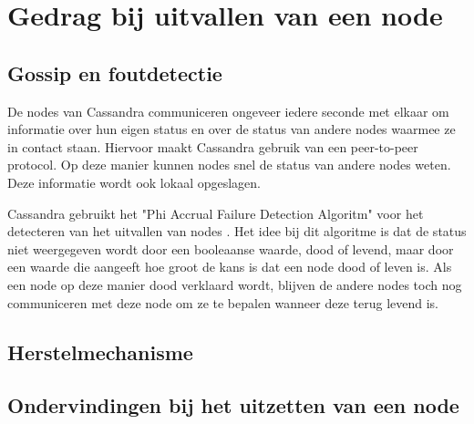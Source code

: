 \chapter{Gedrag bij uitvallen van een node}
\label{ch:cassandra_uitval}

\section{Gossip en foutdetectie}
De nodes van Cassandra communiceren ongeveer iedere seconde met elkaar om informatie over hun eigen status en over de status van andere nodes waarmee ze in contact staan.
Hiervoor maakt Cassandra gebruik van een peer-to-peer protocol.
Op deze manier kunnen nodes snel de status van andere nodes weten.
Deze informatie wordt ook lokaal opgeslagen.

Cassandra gebruikt het "Phi Accrual Failure Detection Algoritm" voor het detecteren van het uitvallen van nodes \citep{kan2014cassandra}.
Het idee bij dit algoritme is dat de status niet weergegeven wordt door een booleaanse waarde, dood of levend, maar door een waarde die aangeeft hoe groot de kans is dat een node dood of leven is.
Als een node op deze manier dood verklaard wordt, blijven de andere nodes toch nog communiceren met deze node om ze te bepalen wanneer deze terug levend is.

\section{Herstelmechanisme}

\section{Ondervindingen bij het uitzetten van een node}